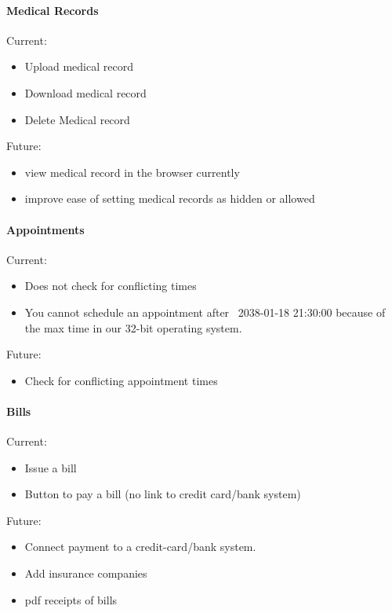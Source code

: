 \documentclass[12pt]{report}
\begin{document}
\paragraph{Medical Records}

Current: 
\begin{itemize}
\item Upload medical record
\item Download medical record
\item Delete Medical record
\end{itemize}

Future:
\begin{itemize}
\item view medical record in the browser currently 
\item improve ease of setting medical records as hidden or allowed
\end{itemize}

\paragraph{Appointments}

Current: 
\begin{itemize}
\item Does not check for conflicting times 
\item You cannot schedule an appointment after ~2038-01-18 21:30:00 because of the max time in our 32-bit operating system. 
\end{itemize}

Future: 
\begin{itemize}
\item Check for conflicting appointment times
\end{itemize}

\paragraph{Bills}

Current:
\begin{itemize}
\item Issue a bill
\item Button to pay a bill (no link to credit card/bank system)
\end{itemize}

Future:
\begin{itemize}
\item Connect payment to a credit-card/bank system.
\item Add insurance companies
\item pdf receipts of bills
\end{itemize}
\end{document}
